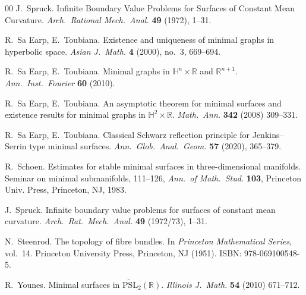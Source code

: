 \documentclass[a4paper,10pt,reqno]{amsart}
\newcommand{\R}{\mathbb{R}}
\theoremstyle{definition}
\theoremstyle{remark}
\numberwithin{equation}{section}
\begin{document}
\begin{thebibliography}{00}
	 J.\ Spruck.
	\newblock  Infinite Boundary Value Problems for Surfaces of Constant Mean Curvature.
	\newblock \emph{Arch.\ Rational Mech.\ Anal.} \textbf{49} (1972), 1--31.
				
	 R.\ Sa Earp, E.\ Toubiana.
	\newblock  Existence and uniqueness of minimal graphs in hyperbolic space.
	\newblock \emph{Asian J.\ Math.} \textbf{4} (2000), no.\ 3, 669--694.
		
	 R.\ Sa Earp, E.\ Toubiana.
	\newblock Minimal graphs in $\mathbb{H}^n\times\R$ and $\R^{n+1}$.
	\newblock \emph{Ann.\ Inst.\ Fourier} \textbf{60} (2010).
		
	 R.\ Sa Earp, E.\ Toubiana.
	\newblock An asymptotic theorem for minimal surfaces and existence results for minimal graphs in $\mathbb{H}^2\times\R$.
	\newblock \emph{Math.\ Ann.} \textbf{342} (2008) 309--331.
	
	 R.\ Sa Earp, E.\ Toubiana.
	\newblock Classical Schwarz reflection principle for Jenkins–Serrin type minimal surfaces.
	\newblock \emph{Ann.\ Glob.\ Anal.\ Geom.} \textbf{57} (2020), 365--379.

	 R.\ Schoen.
	\newblock Estimates for stable minimal surfaces in three-dimensional manifolds.
	\newblock Seminar on minimal submanifolds, 111–126, \emph{Ann.\ of Math.\ Stud.} \textbf{103}, Princeton Univ. Press, Princeton, NJ, 1983.

	 J.\ Spruck.
	\newblock Infinite boundary value problems for surfaces of constant mean curvature.
	\newblock \emph{Arch.\ Rat.\ Mech.\ Anal.} \textbf{49} (1972/73), 1--31.
	
	 N.\ Steenrod.
	\newblock The topology of fibre bundles.
	\newblock In \emph{Princeton Mathematical Series}, vol.\ 14. Princeton University Press, Princeton, NJ (1951). ISBN: 978-069100548-5.

	 R.\ Younes.
	\newblock Minimal surfaces in $\widetilde{\mathrm{PSL}}_2(\R)$.
	\newblock \emph{Illinois J.\ Math.} \textbf{54} (2010) 671--712.
		
\end{thebibliography}
\end{document}
